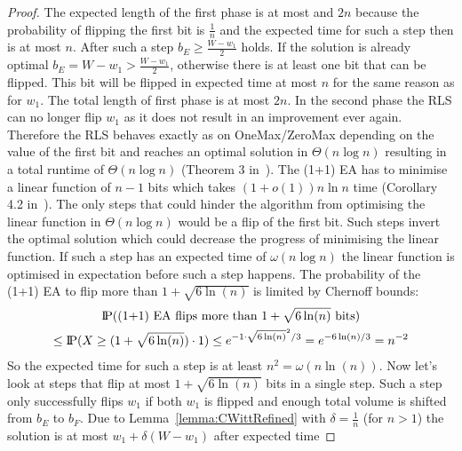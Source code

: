 \begin{proof}
    The expected length of the first phase is at most
    and $2n$ because the probability of flipping the first bit is $\frac{1}{n}$ and the expected time for such a step then is at most $n$.
    After such a step $b_E \ge \frac {W-w_1}{2}$ holds.
    If the solution is already optimal $b_E = W-w_1>\frac {W-w_1}{2}$, otherwise there is at least one bit that can be flipped.
    This bit will be flipped in expected time at most $n$ for the same reason as for $w_1$.
    The total length of first phase is at most $2n$.
    In the second phase the RLS can no longer flip $w_1$ as it does not result in an improvement ever again.
    Therefore the RLS behaves exactly as on OneMax/ZeroMax depending on the value of the first bit and reaches an optimal solution in $\Theta(n\log{}n)$ resulting in a total runtime of $\Theta(n\log{}n)$ (Theorem 3 in~\cite{witt2014fitness}).\newline
    The (1+1) EA has to minimise a linear function of $n-1$ bits which takes $(1+o(1))n\ln n$ time (Corollary 4.2 in~\cite{witt2013tight}).
    The only steps that could hinder the algorithm from optimising the linear function in $\Theta(n\log{}n)$ would be a flip of the first bit.
    Such steps invert the optimal solution which could decrease the progress of minimising the linear function.
    If such a step has an expected time of $\omega(n\log{}n)$ the linear function is optimised in expectation before such a step happens.
    The probability of the (1+1) EA to flip more than $1+\sqrt{6\ln(n)}$ is limited by Chernoff bounds:
    \begin{gather}
        \nonumber \text{I\kern-0.15em P}(\text{(1+1) EA flips more than }1+\sqrt{6\ln(n)}\text{ bits})\\ \nonumber
        \le\text{I\kern-0.15em P}(X\ge (1+\sqrt{6\ln(n)})\cdot 1)
        \le e^{-1\cdot{\sqrt{6\ln(n)}}^2/3}
        = e^{-6\ln(n)/3}
        = n^{-2}
    \end{gather}
    So the expected time for such a step is at least \(n^2=\omega(n\ln(n))\).
    Now let's look at steps that flip at most $1+\sqrt{6\ln(n)}$ bits in a single step.
    Such a step only successfully flips $w_1$ if both $w_1$ is flipped and enough total volume is shifted from $b_E$ to $b_F$.
    Due to Lemma~\ref{lemma:CWittRefined} with $\delta=\frac{1}{n}$ (for $n>1$) the solution is at most $w_1+\delta(W-w_1)$ after expected time

\end{proof}
